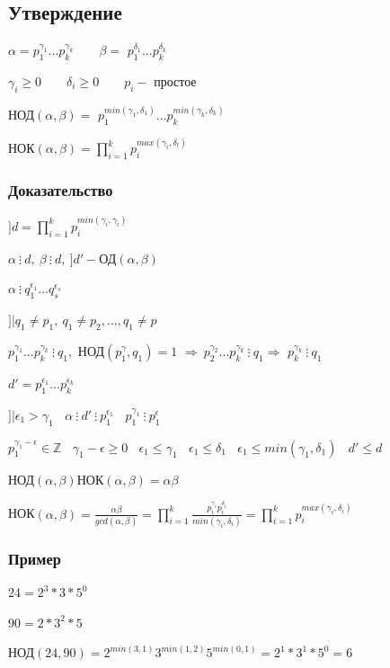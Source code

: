 \documentclass[12pt]{article}
\begin{document}
            \subsection{Утверждение}
        $\alpha=p_1^{\gamma_1}...p_k^{\gamma_k} \qquad \beta=$ $p_1^{\delta_1}...p_k^{\delta_k}$\par
        $\gamma_i \geq 0 \qquad \delta_i \geq 0 \qquad p_i -$ простое \par
            НОД$(\alpha, \beta) =$
$ p_1^{min(\gamma_1, \delta_1)}...p_k^{min(\gamma_k, \delta_k)}$ \par
            НОК$(\alpha, \beta)=\prod_{i=1}^kp_i^{max(\gamma_i, \delta_l)}$
            \subsubsection{Доказательство}
        $] d = \prod_{i=1}^k p_i^{min(\gamma_i, \gamma_i)}$ \par
        $\alpha \ \vdots \ d, \  \beta \ \vdots \ d, \ ]d'-$ОД$(\alpha, \beta)$ \par
        $\alpha \ \vdots \ q_1^{\epsilon_1}...q_s^{\epsilon_s}$ \par
        $]| q_1 \not= p_1, \ q_1\not= p_2,...,q_1\not=p$ \par
        $p_1^{\gamma_1}...p_k^{\gamma_k} \ \vdots \ q_1,$ НОД$(p_1^\gamma, q_1) = 1$
$\Rightarrow \ p_2^{\gamma_2}...p_k^{\gamma_k} \ \vdots \ q_1 \Rightarrow$
$p_k^{\gamma_k}\ \vdots \ q_1$ \par
        $d' = p_1^{\epsilon_1}...p_k^{\epsilon_k}$ \par
        $]| \epsilon_1>\gamma_1 \ \ \ \ \alpha \ \vdots \ d' \ \vdots \ p_1^{\epsilon_1} \ \ \ \ p_1^{\gamma_1} \ \vdots \ p_1^\epsilon$ \par
        $p_1^{\gamma_1 - \epsilon} \in \mathbb{Z} \ \ \ \ \gamma_1-\epsilon \geq 0 \ \ \ \ \epsilon_1 \leq \gamma_1 \ \ \ \ \epsilon_1 \leq \delta_1 \ \ \ \ \epsilon_1 \leq min(\gamma_1, \delta_1) \ \ \ \ d' \leq d$ \par
            НОД$(\alpha, \beta)$НОК$(\alpha, \beta) = \alpha\beta$ \par
            НОК$(\alpha, \beta) = \frac{\alpha\beta}{gcd(\alpha, \beta)}=\prod_{i=1}^k \frac{p_i^{\gamma_i}p_i^{\delta_i}}{min(\gamma_i, \delta_i)}=\prod_{i = 1}^kp_i^{max(\gamma_i, \delta_i)}$
            \subsubsection{Пример}
        $24 = 2^3*3*5^0$ \par $90 = 2 * 3^2 *5$ \par
            НОД$(24, 90) = 2^{min(3, 1)}3 ^{min(1, 2)}5^{min(0, 1)} = 2^1*3^1*5^0=6$
\end{document}
